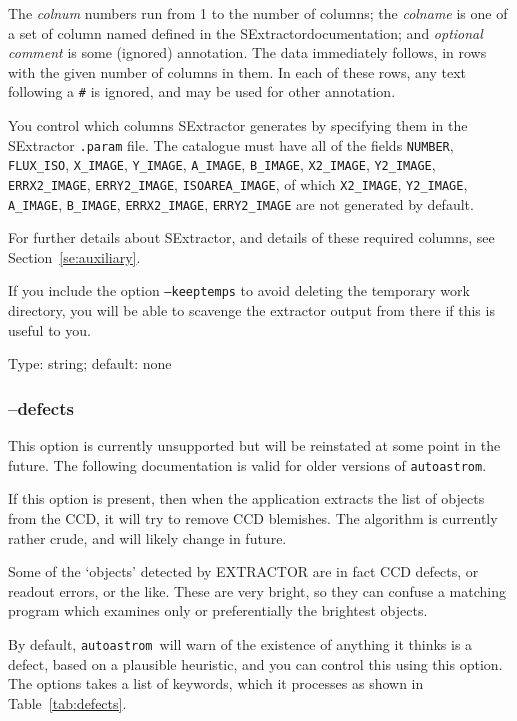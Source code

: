 \documentclass[twoside,11pt]{article}
\newcommand{\xref}[3]{#1}
\newcommand{\xlabel}[1]{}
\newcommand{\autoastrom}{\texttt{autoastrom}}
\newcommand{\SExtractor}{\xref{{\footnotesize SExtractor}}{sun226}}
\begin{document}
The \textit{colnum} numbers run from 1 to the number of columns; the
\textit{colname} is one of a set of column named defined in the \SExtractor\ 
documentation; and \textit{optional comment} is some (ignored) annotation.
The data immediately follows, in rows with the given number of columns in
them.  In each of these rows, any text following a \texttt{\#} is ignored, and
may be used for other annotation.

You control which columns SExtractor generates by specifying them in the
SExtractor \texttt{.param} file.  The catalogue must have all of the fields
\texttt{NUMBER}, \texttt{FLUX\_ISO}, \texttt{X\_IMAGE}, \texttt{Y\_IMAGE},
\texttt{A\_IMAGE}, \texttt{B\_IMAGE}, \texttt{X2\_IMAGE}, \texttt{Y2\_IMAGE},
\texttt{ERRX2\_IMAGE}, \texttt{ERRY2\_IMAGE}, \texttt{ISOAREA\_IMAGE}, of which
\texttt{X2\_IMAGE}, \texttt{Y2\_IMAGE}, \texttt{A\_IMAGE}, \texttt{B\_IMAGE},
\texttt{ERRX2\_IMAGE}, \texttt{ERRY2\_IMAGE} are not generated by default.

For further details about SExtractor, and details of these required columns,
see Section~\ref{se:auxiliary}.

If you include the option \texttt{--keeptemps} to avoid deleting the
temporary work directory, you will be able to scavenge the extractor output
from there if this is useful to you.

Type: string; default: none

\subsubsection{\xlabel{sb_options_defects}--defects\label{sb:options:defects}}

This option is currently unsupported but will be reinstated at some point in
the future. The following documentation is valid for older versions of
\autoastrom.

If this option is present, then when the application extracts the list of
objects from the CCD, it will try to remove CCD blemishes.  The algorithm is
currently rather crude, and will likely change in future.

Some of the `objects' detected by EXTRACTOR are in fact CCD defects, or
readout errors, or the like.  These are very bright, so they can confuse a
matching program which examines only or preferentially the brightest objects.

By default, \autoastrom\ will warn of the existence of anything it thinks is a
defect, based on a plausible heuristic, and you can control this using this
option.  The options takes a list of keywords, which it processes as shown in
Table~\ref{tab:defects}.
\end{document}
